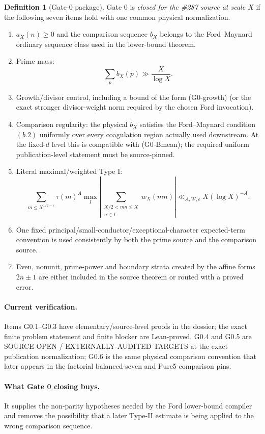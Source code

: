 \documentclass[11pt]{article}
\theoremstyle{definition}
\newtheorem{definition}[theorem]{Definition}
\newcommand{\1}{\mathbf 1}
\newcommand{\status}[1]{\textsf{#1}}
\begin{document}
\begin{definition}[Gate-0 package]
Gate 0 is \emph{closed for the \#287 source at scale $X$} if the following seven items
hold with one common physical normalization.
\begin{enumerate}[label=\textup{G0.\arabic*},leftmargin=2.0em]
\item $a_X(n)\ge0$ and the comparison sequence $b_X$ belongs to the Ford--Maynard
ordinary sequence class used in the lower-bound theorem.
\item Prime mass:
\[
\sum_p b_X(p)\gg \frac{X}{\log X}.
\]
\item Growth/divisor control, including a bound of the form (G0-growth)
(or the exact stronger divisor-weight norm required by the chosen Ford invocation).
\item Comparison regularity: the physical $b_X$ satisfies the Ford--Maynard
condition $(b.2)$ uniformly over every coagulation region actually used downstream.
At the fixed-$d$ level this is compatible with (G0-Bmean); the required
uniform publication-level statement must be source-pinned.
\item Literal maximal/weighted Type I:
\[
\boxed{
\sum_{m\le X^{1/2-\varepsilon}}
\tau(m)^A
\max_I
\left|
\sum_{\substack{X/2<mn\le X\\n\in I}}
w_X(mn)
\right|
\ll_{A,W,\varepsilon}
X(\log X)^{-A}.}
\tag{G0-I}
\]
\item One fixed principal/small-conductor/exceptional-character expected-term
convention is used consistently by both the prime source and the comparison source.
\item Even, nonunit, prime-power and boundary strata created by the affine forms
$2n\pm1$ are either included in the source theorem or routed with a proved error.
\end{enumerate}
\end{definition}

\paragraph{Current verification.}
Items G0.1--G0.3 have elementary/source-level proofs in the dossier; the exact finite
problem statement and finite blocker are Lean-proved.  G0.4 and G0.5 are
\status{SOURCE-OPEN / EXTERNALLY-AUDITED TARGETS} at the exact publication normalization;
G0.6 is the same physical comparison convention that later appears in the factorial
balanced-seven and Pure5 comparison pins.

\paragraph{What Gate 0 closing buys.}
It supplies the non-parity hypotheses needed by the Ford lower-bound compiler and removes
the possibility that a later Type-II estimate is being applied to the wrong comparison
sequence.
\end{document}
